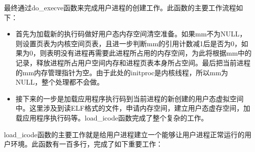 最终通过do\_execve函数来完成用户进程的创建工作。此函数的主要工作流程如下：

\begin{itemize}
\tightlist
\item
  首先为加载新的执行码做好用户态内存空间清空准备。如果mm不为NULL，则设置页表为内核空间页表，且进一步判断mm的引用计数减1后是否为0，如果为0，则表明没有进程再需要此进程所占用的内存空间，为此将根据mm中的记录，释放进程所占用户空间内存和进程页表本身所占空间。最后把当前进程的mm内存管理指针为空。由于此处的initproc是内核线程，所以mm为NULL，整个处理都不会做。
\item
  接下来的一步是加载应用程序执行码到当前进程的新创建的用户态虚拟空间中。这里涉及到读ELF格式的文件，申请内存空间，建立用户态虚存空间，加载应用程序执行码等。load\_icode函数完成了整个复杂的工作。
\end{itemize}

load\_icode函数的主要工作就是给用户进程建立一个能够让用户进程正常运行的用户环境。此函数有一百多行，完成了如下重要工作：

